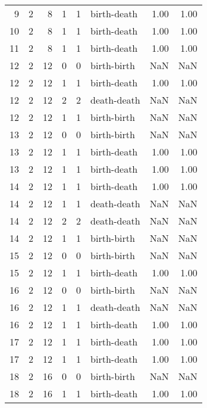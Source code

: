 \documentclass{article}
\begin{document}
\begin{center}
\begin{tabular}{rrrrrlrr}
9 & 2 & 8 & 1 & 1 & birth-death & 1.00 & 1.00 \\
10 & 2 & 8 & 1 & 1 & birth-death & 1.00 & 1.00 \\
11 & 2 & 8 & 1 & 1 & birth-death & 1.00 & 1.00 \\
12 & 2 & 12 & 0 & 0 & birth-birth & NaN & NaN \\
12 & 2 & 12 & 1 & 1 & birth-death & 1.00 & 1.00 \\
12 & 2 & 12 & 2 & 2 & death-death & NaN & NaN \\
12 & 2 & 12 & 1 & 1 & birth-birth & NaN & NaN \\
13 & 2 & 12 & 0 & 0 & birth-birth & NaN & NaN \\
13 & 2 & 12 & 1 & 1 & birth-death & 1.00 & 1.00 \\
13 & 2 & 12 & 1 & 1 & birth-death & 1.00 & 1.00 \\
14 & 2 & 12 & 1 & 1 & birth-death & 1.00 & 1.00 \\
14 & 2 & 12 & 1 & 1 & death-death & NaN & NaN \\
14 & 2 & 12 & 2 & 2 & death-death & NaN & NaN \\
14 & 2 & 12 & 1 & 1 & birth-birth & NaN & NaN \\
15 & 2 & 12 & 0 & 0 & birth-birth & NaN & NaN \\
15 & 2 & 12 & 1 & 1 & birth-death & 1.00 & 1.00 \\
16 & 2 & 12 & 0 & 0 & birth-birth & NaN & NaN \\
16 & 2 & 12 & 1 & 1 & death-death & NaN & NaN \\
16 & 2 & 12 & 1 & 1 & birth-death & 1.00 & 1.00 \\
17 & 2 & 12 & 1 & 1 & birth-death & 1.00 & 1.00 \\
17 & 2 & 12 & 1 & 1 & birth-death & 1.00 & 1.00 \\
18 & 2 & 16 & 0 & 0 & birth-birth & NaN & NaN \\
18 & 2 & 16 & 1 & 1 & birth-death & 1.00 & 1.00 \\
\bottomrule
\end{tabular}


\end{center}
\end{document}

